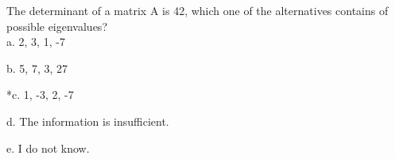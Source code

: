  
The determinant of a matrix A is 42, which one of the alternatives contains of possible eigenvalues? \\

a. 2, 3, 1, -7

b. 5, 7, 3, 27

*c. 1, -3, 2, -7

d. The information is insufficient.

e. I do not know.\\

